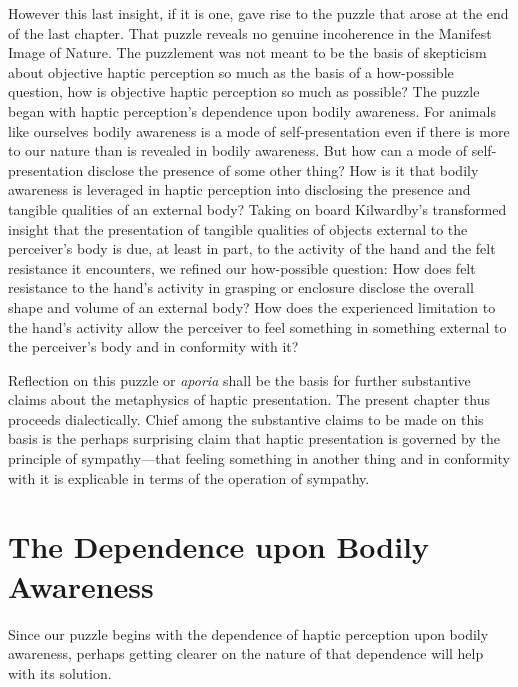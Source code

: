 However this last insight, if it is one, gave rise to the puzzle that arose at the end of the last chapter. That puzzle reveals no genuine incoherence in the Manifest Image of Nature. The puzzlement was not meant to be the basis of skepticism about objective haptic perception so much as the basis of a how-possible question, how is objective haptic perception so much as possible? The puzzle began with haptic perception's dependence upon bodily awareness. For animals like ourselves bodily awareness is a mode of self-presentation even if there is more to our nature than is revealed in bodily awareness. But how can a mode of self-presentation disclose the presence of some other thing? How is it that bodily awareness is leveraged in haptic perception into disclosing the presence and tangible qualities of an external body? Taking on board Kilwardby's transformed insight that the presentation of tangible qualities of objects external to the perceiver's body is due, at least in part, to the activity of the hand and the felt resistance it encounters, we refined our how-possible question: How does felt resistance to the hand's activity in grasping or enclosure disclose the overall shape and volume of an external body? How does the experienced limitation to the hand's activity allow the perceiver to feel something in something external to the perceiver's body and in conformity with it?

Reflection on this puzzle or \emph{aporia} shall be the basis for further substantive claims about the metaphysics of haptic presentation. The present chapter thus proceeds dialectically. Chief among the substantive claims to be made on this basis is the perhaps surprising claim that haptic presentation is governed by the principle of sympathy---that feeling something in another thing and in conformity with it is explicable in terms of the operation of sympathy. 


\section{The Dependence upon Bodily Awareness} %
\label{sec:the_dependence_of_haptic_perception_upon_bodily_awareness}

Since our puzzle begins with the dependence of haptic perception upon bodily awareness, perhaps getting clearer on the nature of that dependence will help with its solution. 

